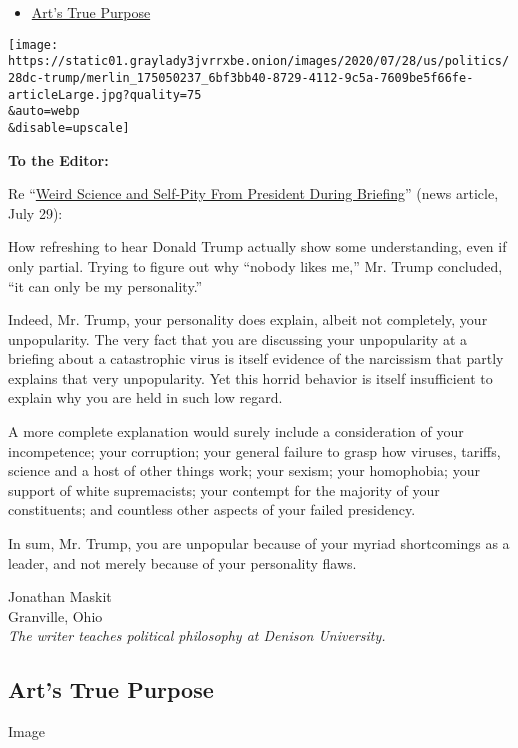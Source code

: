 \begin{itemize}
\tightlist
\item
  \protect\hyperlink{link-f3ed0bf}{Art's True Purpose}
\end{itemize}

\texttt{[image: https://static01.graylady3jvrrxbe.onion/images/2020/07/28/us/politics/28dc-trump/merlin\_175050237\_6bf3bb40-8729-4112-9c5a-7609be5f66fe-articleLarge.jpg?quality=75\\\&auto=webp\\\&disable=upscale]}

\textbf{To the Editor:}

Re
``\href{https://www.nytimes3xbfgragh.onion/2020/07/28/us/politics/trump-nobody-likes-me-walks-out-briefing.html}{Weird
Science and Self-Pity From President During Briefing}'' (news article,
July 29):

How refreshing to hear Donald Trump actually show some understanding,
even if only partial. Trying to figure out why ``nobody likes me,'' Mr.
Trump concluded, ``it can only be my personality.''

Indeed, Mr. Trump, your personality does explain, albeit not completely,
your unpopularity. The very fact that you are discussing your
unpopularity at a briefing about a catastrophic virus is itself evidence
of the narcissism that partly explains that very unpopularity. Yet this
horrid behavior is itself insufficient to explain why you are held in
such low regard.

A more complete explanation would surely include a consideration of your
incompetence; your corruption; your general failure to grasp how
viruses, tariffs, science and a host of other things work; your sexism;
your homophobia; your support of white supremacists; your contempt for
the majority of your constituents; and countless other aspects of your
failed presidency.

In sum, Mr. Trump, you are unpopular because of your myriad shortcomings
as a leader, and not merely because of your personality flaws.

Jonathan Maskit\\
Granville, Ohio\\
\emph{The writer teaches political philosophy at Denison University.}

\hypertarget{arts-true-purpose}{%
\subsection{Art's True Purpose}\label{arts-true-purpose}}

Image

